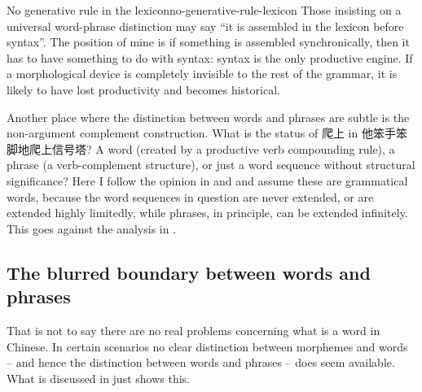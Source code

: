 \documentclass[UTF8, a4paper, oneside, scheme=plain]{ctexrep}
\newcommand*{\citesec}[1]{\S~{#1}}
\newcommand*{\citepage}[1]{pp.~{#1}}
\begin{document}
\begin{theorybox}{No generative rule in the lexicon}{no-generative-rule-lexicon}
    Those insisting on a universal word-phrase distinction 
    may say ``it is assembled in the lexicon before syntax''.
    The position of mine is if something is assembled synchronically,
    then it has to have something to do with syntax:
    syntax is the only productive engine.
    If a morphological device is completely invisible to the rest of the grammar,
    it is likely to have lost productivity and becomes historical.
\end{theorybox}

Another place where the distinction between words and phrases are subtle is 
the non-argument complement construction.
What is the status of 爬上 in 他笨手笨脚地爬上信号塔?
A word (created by a productive verb compounding rule), 
a phrase (a verb-complement structure),
or just a word sequence without structural significance?
Here I follow the opinion in \citep[\citepage{86}]{feng2000} and \citep{tham2015resultative}
and assume these are grammatical words,
because the word sequences in question are never extended,
or are extended highly limitedly,
while phrases, in principle, can be extended infinitely.
This goes against the analysis in \citep[\citesec{1.2.7}]{zhudexigrammar}.

\subsection{The blurred boundary between words and phrases}\label{sec:pos.morpheme-to-clause.blur-line-word-phrase}

That is not to say there are no real problems concerning what is a word in Chinese.
In certain scenarios no clear distinction between morphemes and words
-- and hence the distinction between words and phrases --
does seem available.
What is discussed in  just shows this.
\end{document}
